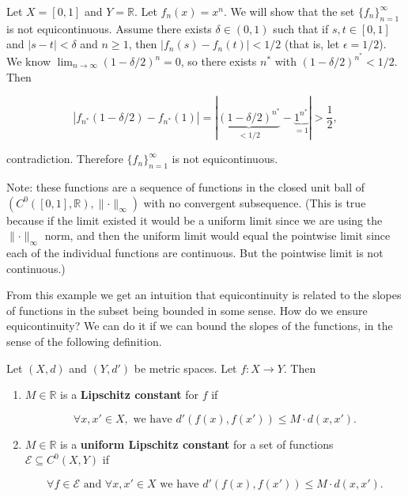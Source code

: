 \begin{example}

Let \(X = [0,1]\) and \(Y = \mathbb{R}\). Let \(f_n(x) = x^n\). We will show that the set \(\{f_n\}_{n=1}^\infty\) is not equicontinuous. Assume there exists \(\delta \in( 0, 1)\) such that if \(s, t \in [0,1]\) and \(|s -t | < \delta\) and \(n \geq 1\), then \(|f_n(s) -f_n(t)| <1/2\) (that is, let \(\epsilon = 1/2\)).  We know \(\lim_{n \to \infty} (1 - \delta/2)^n = 0\), so there exists \(n^*\) with \((1 -\delta/2)^{n^*} < 1/2\). Then

\[
\left| f_{n^*}(1 - \delta/2) -  f_{n^*}(1) \right| = \left| \underbrace{(1 - \delta/2)^{n^*}}_{< 1/2} -  \underbrace{1^{n^*}}_{=1} \right| > \frac{1}{2},
\]

contradiction. Therefore \(\{f_n\}_{n=1}^\infty\) is not equicontinuous. 

Note: these functions are a sequence of functions in the closed unit ball of \((C^0([0,1], \mathbb{R}), \lVert \cdot \rVert_\infty)\) with no convergent subsequence. (This is true because if the limit existed it would be a uniform limit since we are using the \( \lVert \cdot \rVert_\infty\) norm, and then the uniform limit would equal the pointwise limit since each of the individual functions are continuous. But the pointwise limit is not continuous.)

\end{example}

From this example we get an intuition that equicontinuity is related to the slopes of functions in the subset being bounded in some sense. How do we ensure equicontinuity? We can do it if we can bound the slopes of the functions, in the sense of the following definition.

\begin{definition}\label{ra.def.lipschitz}

Let \((X, d)\) and \((Y, d')\) be metric spaces. Let \(f: X \to Y\). Then 

\begin{enumerate}

\item \(M \in \mathbb{R}\) is a \textbf{Lipschitz constant} for \(f\) if 

\[
\forall x, x' \in X, \text{ we have } d'(f(x), f(x')) \leq M  \cdot d(x, x').
\]

\item \(M \in \mathbb{R}\) is a \textbf{uniform Lipschitz constant} for a set of functions \(\mathcal{E} \subseteq C^0(X, Y)\) if 

\[
\forall f \in \mathcal{E} \text{ and } \forall x, x' \in X \text{ we have } d'(f(x), f(x')) \leq M \cdot d(x, x').
\]

\end{enumerate}

\end{definition}

